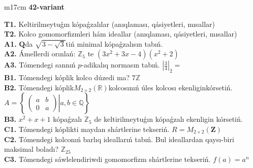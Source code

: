 \documentclass{article}
\begin{document}
\begin{tabular}{m{17cm}}
\textbf{42-variant}
\newline

\textbf{T1.} Keltirilmeytuǵın kópaǵzalılar (anıqlaması, qásiyetleri, mısallar) \\
\textbf{T2.} Kolco gomomorfizmleri hám ideallar (anıqlaması, qásiyetleri, mısallar) \\
\textbf{A1.} \(\mathbf{Q}\)da \(\sqrt{3 - \sqrt{3}}\)tiń minimal kópaǵzalısın tabıń. \\
\textbf{A2.} Ámellerdi orınlań: \(\mathbb{Z}_{5}\) te \(\left( 3x^{2} + 3x - 4 \right)\left( x^{2} + 2 \right)\) \\
\textbf{A3.} Tómendegi sannıń \(p\)-adikalıq normasın tabıń. \(|\frac{3}{4}|_{2} =\) \\
\textbf{B1.} Tómendegi kóplik kolco dúzedi ma? \(7\mathbb{Z}\) \\
\textbf{B2.} Tómendegi kóplik\(M_{2 \times 2}\left( \mathbb{R} \right)\)kolcosınıń úles kolcosı ekenliginkórsetiń. \(A = \left\{ \left. \ \begin{pmatrix}
a & b \\
0 & a
\end{pmatrix} \right|a,b\mathbb{\in Q} \right\}\) \\
\textbf{B3.} \(x^{2} + x + 1\) kópaǵzalı \(\mathbb{Z}_{5}\) de keltirilmeytuǵın kópaǵzalı ekenligin kórsetiń. \\
\textbf{C1.} Tómendegi kóplikti maydan shártlerine tekseriń. \(R = M_{2 \times 2}\left( \mathbf{Z} \right)\) \\
\textbf{C2.} Tómendegi kolconıń barlıq ideallarıń tabıń. Bul ideallardan qaysı-biri maksimal boladı? \(\mathbb{Z}_{25}\) \\
\textbf{C3.} Tómendegi sáwlelendiriwdi gomomorfizm shártlerine tekseriń. \(f(a) = a^{n}\) \\

\end{tabular}
\vspace{1cm}
\end{document}
